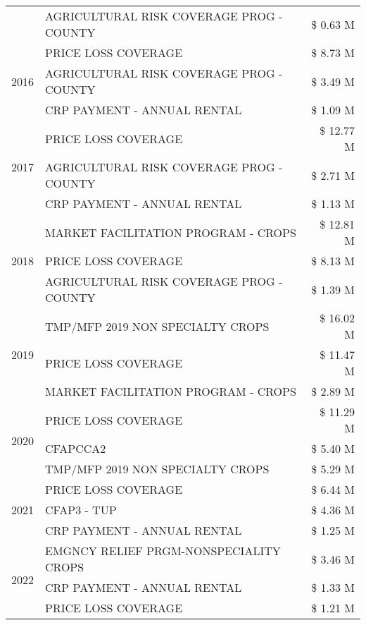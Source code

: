 \begin{tabular}{llr}
 & AGRICULTURAL RISK COVERAGE PROG - COUNTY & \$ 0.63 M \\
\cline{1-3}
\multirow[t]{3}{*}{2016} & PRICE LOSS COVERAGE & \$ 8.73 M \\
 & AGRICULTURAL RISK COVERAGE PROG - COUNTY & \$ 3.49 M \\
 & CRP PAYMENT - ANNUAL RENTAL & \$ 1.09 M \\
\cline{1-3}
\multirow[t]{3}{*}{2017} & PRICE LOSS COVERAGE & \$ 12.77 M \\
 & AGRICULTURAL RISK COVERAGE PROG - COUNTY & \$ 2.71 M \\
 & CRP PAYMENT - ANNUAL RENTAL & \$ 1.13 M \\
\cline{1-3}
\multirow[t]{3}{*}{2018} & MARKET FACILITATION PROGRAM - CROPS & \$ 12.81 M \\
 & PRICE LOSS COVERAGE & \$ 8.13 M \\
 & AGRICULTURAL RISK COVERAGE PROG - COUNTY & \$ 1.39 M \\
\cline{1-3}
\multirow[t]{3}{*}{2019} & TMP/MFP 2019 NON SPECIALTY CROPS & \$ 16.02 M \\
 & PRICE LOSS COVERAGE & \$ 11.47 M \\
 & MARKET FACILITATION PROGRAM - CROPS & \$ 2.89 M \\
\cline{1-3}
\multirow[t]{3}{*}{2020} & PRICE LOSS COVERAGE & \$ 11.29 M \\
 & CFAPCCA2 & \$ 5.40 M \\
 & TMP/MFP 2019 NON SPECIALTY CROPS & \$ 5.29 M \\
\cline{1-3}
\multirow[t]{3}{*}{2021} & PRICE LOSS COVERAGE & \$ 6.44 M \\
 & CFAP3 - TUP & \$ 4.36 M \\
 & CRP PAYMENT - ANNUAL RENTAL & \$ 1.25 M \\
\cline{1-3}
\multirow[t]{3}{*}{2022} & EMGNCY RELIEF PRGM-NONSPECIALITY CROPS & \$ 3.46 M \\
 & CRP PAYMENT - ANNUAL RENTAL & \$ 1.33 M \\
 & PRICE LOSS COVERAGE & \$ 1.21 M \\
\cline{1-3}
\bottomrule
\end{tabular}
